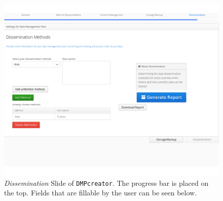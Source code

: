 \begin{landscape}
\begin{figure}[]
	\centering
	\label{Dissemination}
	\includegraphics[width=1.2\textwidth]{pictures/Dissemination.png}
	\caption{\textit{Dissemination} Slide of \texttt{DMPcreator}. The progress bar is placed on the top. Fields that are fillable by the user can be seen below.}
\end{figure}
\end{landscape}